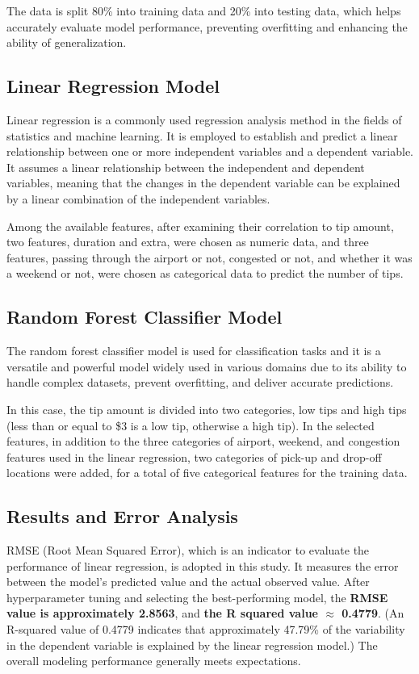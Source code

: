 \documentclass[11pt]{article}
\begin{document}
The data is split 80\% into training data and 20\% into testing data, which helps accurately evaluate model performance, preventing overfitting and enhancing the ability of generalization.

\subsection{Linear Regression Model}
Linear regression is a commonly used regression analysis method in the fields of statistics and machine learning. It is employed to establish and predict a linear relationship between one or more independent variables and a dependent variable. It assumes a linear relationship between the independent and dependent variables, meaning that the changes in the dependent variable can be explained by a linear combination of the independent variables.\cite{lr}

Among the available features, after examining their correlation to tip amount, two features, duration and extra, were chosen as numeric data, and three features, passing through the airport or not, congested or not, and whether it was a weekend or not, were chosen as categorical data to predict the number of tips.

\subsection{Random Forest Classifier Model}
The random forest classifier model is used for classification tasks and it is a versatile and powerful model widely used in various domains due to its ability to handle complex datasets, prevent overfitting, and deliver accurate predictions.\cite{rf}

In this case, the tip amount is divided into two categories, low tips and high tips (less than or equal to \$3 is a low tip, otherwise a high tip). In the selected features, in addition to the three categories of airport, weekend, and congestion features used in the linear regression, two categories of pick-up and drop-off locations were added, for a total of five categorical features for the training data.

\subsection{Results and Error Analysis}
RMSE (Root Mean Squared Error), which is an indicator to evaluate the performance of linear regression, is adopted in this study. It measures the error between the model's predicted value and the actual observed value. After hyperparameter tuning and selecting the best-performing model, the \textbf{RMSE value is approximately 2.8563}, and \textbf{the R squared value $\approx$ 0.4779}. (An R-squared value of 0.4779 indicates that approximately 47.79\% of the variability in the dependent variable is explained by the linear regression model.) The overall modeling performance generally meets expectations.
\end{document}
